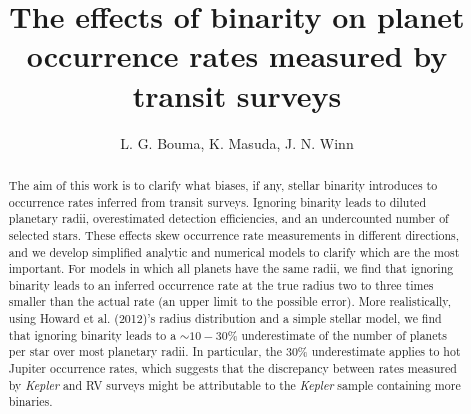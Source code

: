 \documentclass[12pt,modern]{aastex61}
\begin{document}
    
\title{ The effects of binarity on planet occurrence rates measured by transit 
surveys}

\author{
L. G. Bouma, K. Masuda, J. N. Winn
}

\begin{abstract}

The aim of this work is to clarify what biases, if any, stellar binarity 
introduces to occurrence rates inferred from transit surveys.
Ignoring binarity leads to diluted planetary radii, overestimated 
detection efficiencies, and an undercounted number of selected stars.
These effects skew occurrence rate measurements in different directions, and 
we develop simplified analytic and numerical models to clarify which are the 
most important.
For models in which all planets have the same radii, we find that 
ignoring binarity leads to an inferred occurrence rate at the true radius two 
to three times smaller than the actual rate (an upper limit to the possible 
error).
More realistically, using Howard et al. (2012)'s radius distribution and a 
simple stellar model, we find that ignoring binarity leads to a $\sim10-30\%$ 
underestimate of the number of planets per star over most planetary radii.
In particular, the 30\% underestimate applies to hot Jupiter occurrence rates, 
which suggests that the discrepancy between rates measured by {\it Kepler} and 
RV surveys might be attributable to the {\it Kepler} sample containing more 
binaries.

\end{abstract}








\end{document}
